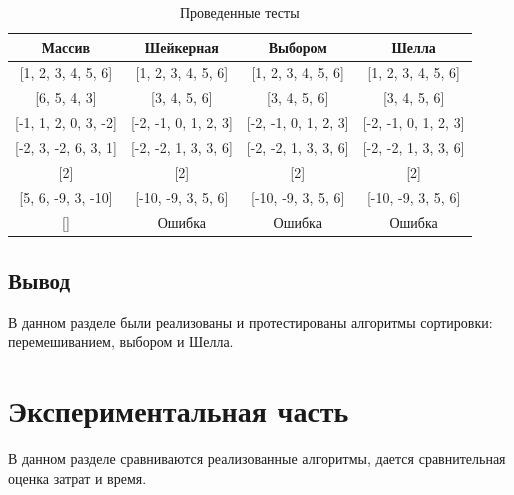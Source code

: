 \documentclass[12pt]{report}
\begin{document}
    \begin{table}[H]
        \begin{center}
            \captionsetup{justification=raggedleft, singlelinecheck=false}
            \caption[]{\label{tab:tests} Проведенные тесты}

            \begin{tabular}{|c|c|c|c|}
                \hline
                \rule[-1ex]{0pt}{2.5ex} Массив               & Шейкерная            & Выбором              & Шелла                \\
                \hline
                \rule[-1ex]{0pt}{2.5ex} [1, 2, 3, 4, 5, 6]   & [1, 2, 3, 4, 5, 6]   & [1, 2, 3, 4, 5, 6] & [1, 2, 3, 4, 5, 6] \\
                \hline
                \rule[-1ex]{0pt}{2.5ex} [6, 5, 4, 3]         & [3, 4, 5, 6]         & [3, 4, 5, 6]         & [3, 4, 5, 6]         \\
                \hline
                \rule[-1ex]{0pt}{2.5ex} [-1, 1, 2, 0, 3, -2] & [-2, -1, 0, 1, 2, 3] & [-2, -1, 0, 1, 2, 3] & [-2, -1, 0, 1, 2, 3] \\
                \hline
                \rule[-1ex]{0pt}{2.5ex} [-2, 3, -2, 6, 3, 1] & [-2, -2, 1, 3, 3, 6] & [-2, -2, 1, 3, 3, 6] & [-2, -2, 1, 3, 3, 6] \\
                \hline
                \rule[-1ex]{0pt}{2.5ex} [2]                  & [2]                  & [2]                  & [2]                  \\
                \hline
                \rule[-1ex]{0pt}{2.5ex} [5, 6, -9, 3, -10]   & [-10, -9, 3, 5, 6]   & [-10, -9, 3, 5, 6] & [-10, -9, 3, 5, 6] \\
                \hline
                \rule[-1ex]{0pt}{2.5ex} []                   & Ошибка               & Ошибка               & Ошибка               \\
                \hline

            \end{tabular}
        \end{center}
    \end{table}


    \section{Вывод}
    В данном разделе были реализованы и протестированы алгоритмы сортировки: перемешиванием, выбором и Шелла.
    \newpage


    \chapter{Экспериментальная часть}
    В данном разделе сравниваются реализованные алгоритмы, дается сравнительная оценка затрат и время.
\end{document}
